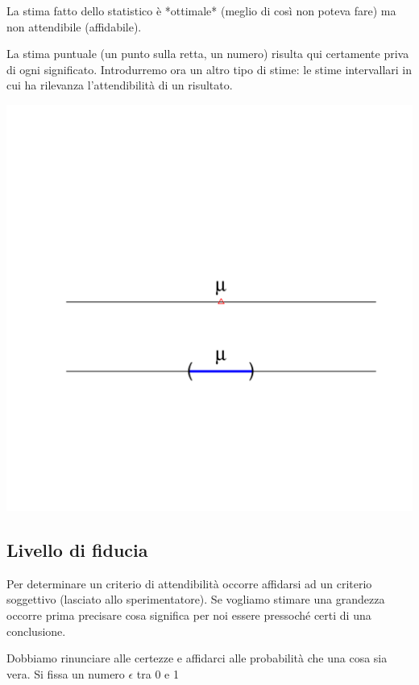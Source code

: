 \documentclass[onecolumn,12pt]{book}\usepackage[]{graphicx}\usepackage[]{color}
\makeatletter
\def\maxwidth{ %
  \ifdim\Gin@nat@width>\linewidth
    \linewidth
  \else
    \Gin@nat@width
  \fi
}
\newenvironment{knitrout}{}{} %
\makeatother
\begin{document}
La stima fatto dello statistico è  *ottimale* (meglio di così non poteva fare) ma non attendibile (affidabile).

La stima puntuale (un punto sulla retta, un numero) risulta qui certamente priva di ogni significato. Introdurremo ora un altro tipo di stime: le stime intervallari in cui ha rilevanza l'attendibilità  di un risultato. 

\begin{knitrout}
\color{fgcolor}
\includegraphics[width=\maxwidth]{figure/unnamed-chunk-30-1} 

\end{knitrout}


\subsection{Livello di fiducia}

Per determinare un criterio di attendibilità  occorre affidarsi ad un criterio soggettivo (lasciato allo sperimentatore). Se vogliamo  stimare una grandezza occorre prima precisare cosa significa per noi essere pressoché certi di una conclusione.  

Dobbiamo rinunciare  alle certezze e affidarci alle probabilità  che una cosa sia vera. 
Si fissa un numero $\epsilon$  tra 0 e 1
\end{document}
